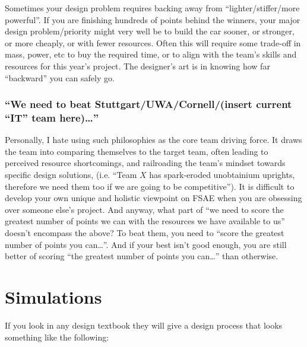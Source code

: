 \documentclass[10pt, a4paper, article, oneside, twocolumn, final]{memoir}
\begin{document}
Sometimes your design problem requires backing away from “lighter/\allowbreak stiffer/\allowbreak more powerful”. If you are finishing hundreds of points behind the winners, your major design problem/\allowbreak priority might very well be to build the car sooner, or stronger, or more cheaply, or with fewer resources. Often this will require some trade-off in mass, power, etc to buy the required time, or to align with the team's skills and resources for this year's project. The designer's art is in knowing how far “backward” you can safely go. 

\subsection*{“We need to beat Stuttgart/\allowbreak UWA/\allowbreak Cornell/\allowbreak (insert current “IT” team here)\ldots”}
Personally, I hate using such philosophies as the core team driving force. It draws the team into comparing themselves to the target team, often leading to perceived resource shortcomings, and railroading the team's mindset towards specific design solutions, (i.e. “Team $X$ has spark-eroded unobtainium uprights, therefore we need them too if we are going to be competitive”). It is difficult to develop your own unique and holistic viewpoint on FSAE when you are obsessing over someone else's project. And anyway, what part of “we need to score the greatest number of points we can with the resources we have available to us” doesn't encompass the above? To beat them, you need to “score the greatest number of points you can\ldots”. And if your best isn't good enough, you are still better of scoring “the greatest number of points you can\ldots” than otherwise. 



\chapter*{Simulations}

If you look in any design textbook they will give a design process that looks something like the following:
\end{document}
